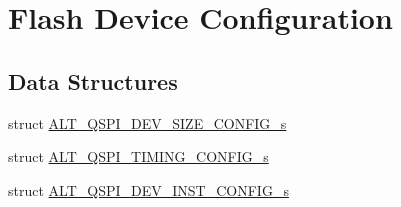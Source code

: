 \hypertarget{group__ALT__QSPI__DEV__CFG}{}\section{Flash Device Configuration}
\label{group__ALT__QSPI__DEV__CFG}
\subsection*{Data Structures}
\begin{DoxyCompactItemize}
\item 
struct \mbox{\hyperlink{structALT__QSPI__DEV__SIZE__CONFIG__s}{A\+L\+T\+\_\+\+Q\+S\+P\+I\+\_\+\+D\+E\+V\+\_\+\+S\+I\+Z\+E\+\_\+\+C\+O\+N\+F\+I\+G\+\_\+s}}
\item 
struct \mbox{\hyperlink{structALT__QSPI__TIMING__CONFIG__s}{A\+L\+T\+\_\+\+Q\+S\+P\+I\+\_\+\+T\+I\+M\+I\+N\+G\+\_\+\+C\+O\+N\+F\+I\+G\+\_\+s}}
\item 
struct \mbox{\hyperlink{structALT__QSPI__DEV__INST__CONFIG__s}{A\+L\+T\+\_\+\+Q\+S\+P\+I\+\_\+\+D\+E\+V\+\_\+\+I\+N\+S\+T\+\_\+\+C\+O\+N\+F\+I\+G\+\_\+s}}
\end{DoxyCompactItemize}
